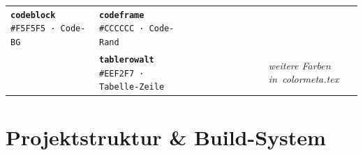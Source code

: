 \documentclass[a4paper, 11pt, ngerman]{article}
\begin{document}
\begin{tcolorbox}[cs, title={Alle definierten Farben — nur \texttt{colormeta.tex} anpassen}]
\begin{tabular}{@{} p{3.55cm} p{3.55cm} p{3.55cm} p{3.55cm} @{}}
  \cellcolor{codeblock}\textcolor{primary}{\texttt{\textbf{codeblock}}}%
    \newline\textcolor{primary}{\scriptsize\texttt{\#F5F5F5 · Code-BG}} &
  \cellcolor{codeframe}\textcolor{primary}{\texttt{\textbf{codeframe}}}%
    \newline\textcolor{primary}{\scriptsize\texttt{\#CCCCCC · Code-Rand}}
  \\
  \cellcolor{tableheader}\textcolor{white}{\texttt{\textbf{tableheader}}}%
    \newline\textcolor{white}{\scriptsize\texttt{\#2E4057 · Tabelle-Kopf}} &
  \cellcolor{tablerowalt}\textcolor{primary}{\texttt{\textbf{tablerowalt}}}%
    \newline\textcolor{primary}{\scriptsize\texttt{\#EEF2F7 · Tabelle-Zeile}} &
  \cellcolor{stepcolor}\textcolor{white}{\texttt{\textbf{stepcolor}}}%
    \newline\textcolor{white}{\scriptsize\texttt{\#048A81 · Schritt-Badge}} &
  \cellcolor{white}\textcolor{primary!40!white}{\textit{\small weitere Farben \mbox{in colormeta.tex}}}
  \\
\end{tabular}
\end{tcolorbox}

\vspace{0.55em}

\section*{Projektstruktur \& Build-System}
\end{document}
